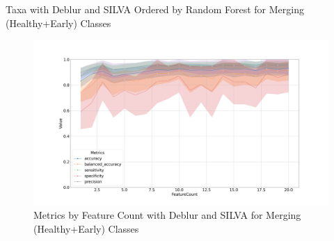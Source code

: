 \documentclass[a4paper]{article}
\begin{document}
{            \begin{table}[p]
                \centering
                \caption{Taxa with Deblur and SILVA Ordered by Random Forest for Merging (Healthy+Early) Classes}
                \label{tb:RF-HE-Deblur-silva}

            \end{table}

            \begin{figure}[p]
                \centering
                \includegraphics[width=0.7 \linewidth]{figures/RandomForest/one.Deblur.silva/metrics.png}
                \caption{Metrics by Feature Count with Deblur and SILVA for Merging (Healthy+Early) Classes}
                \label{fig:RF-HE-metrics-Deblur-silva}
            \end{figure}

}
\end{document}

